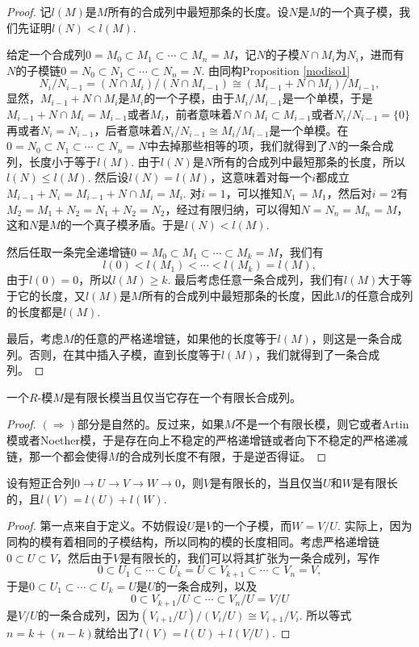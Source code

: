 \begin{proof}
	记$l(M)$是$M$所有的合成列中最短那条的长度。设$N$是$M$的一个真子模，我们先证明$l(N)<l(M)$.

	给定一个合成列$0=M_0\subset M_1\subset \cdots\subset M_n=M$，记$N$的子模$N\cap M_i$为$N_i$，进而有$N$的子模链$0=N_0\subset N_1\subset \cdots\subset N_n=N$. 由同构Proposition \ref{modiso1}
	\[
	N_i/N_{i-1}=(N\cap M_i)/(N\cap M_{i-1})\cong (M_{i-1}+N\cap M_i)/M_{i-1},
	\]
	显然，$M_{i-1}+N\cap M_i$是$M_i$的一个子模，由于$M_i/M_{i-1}$是一个单模，于是$M_{i-1}+N\cap M_i=M_{i-1}$或者$M_i$，前者意味着$N\cap M_i\subset M_{i-1}$或者$N_i/N_{i-1}=\{0\}$再或者$N_i=N_{i-1}$，后者意味着$N_i/N_{i-1}\cong M_i/M_{i-1}$是一个单模。在$0=N_0\subset N_1\subset \cdots\subset N_n=N$中去掉那些相等的项，我们就得到了$N$的一条合成列，长度小于等于$l(M)$. 由于$l(N)$是$N$所有的合成列中最短那条的长度，所以$l(N)\leq l(M)$. 然后设$l(N)=l(M)$，这意味着对每一个$i$都成立$M_{i-1}+N_i=M_{i-1}+N\cap M_i=M_i$. 对$i=1$，可以推知$N_1=M_1$，然后对$i=2$有$M_2=M_1+N_2=N_1+N_2=N_2$，经过有限归纳，可以得知$N=N_n=M_n=M$，这和$N$是$M$的一个真子模矛盾。于是$l(N)<l(M)$.

	然后任取一条完全递增链$0=M_0\subset M_1\subset \cdots\subset M_k=M$，我们有
	\[
	l(0)<l(M_1)<\cdots<l(M_k)=l(M),
	\]
	由于$l(0)=0$，所以$l(M)\geq k$. 最后考虑任意一条合成列，我们有$l(M)$大于等于它的长度，又$l(M)$是$M$所有的合成列中最短那条的长度，因此$M$的任意合成列的长度都是$l(M)$.

	最后，考虑$M$的任意的严格递增链，如果他的长度等于$l(M)$，则这是一条合成列。否则，在其中插入子模，直到长度等于$l(M)$，我们就得到了一条合成列。
\end{proof}

\begin{pro}
一个$R$-模$M$是有限长模当且仅当它存在一个有限长合成列。
\end{pro}

\begin{proof}
	$(\Rightarrow)$部分是自然的。反过来，如果$M$不是一个有限长模，则它或者Artin模或者Noether模，于是存在向上不稳定的严格递增链或者向下不稳定的严格递减链，那一个都会使得$M$的合成列长度不有限，于是逆否得证。
\end{proof}

\begin{pro}
设有短正合列$0\to U\to V\to W\to 0$，则$V$是有限长的，当且仅当$U$和$W$是有限长的，且$l(V)=l(U)+l(W)$.
\end{pro}

\begin{proof}
	第一点来自于定义。不妨假设$U$是$V$的一个子模，而$W=V/U$. 实际上，因为同构的模有着相同的子模结构，所以同构的模的长度相同。考虑严格递增链$0\subset U\subset V$，然后由于$V$是有限长的，我们可以将其扩张为一条合成列，写作
	\[
	0\subset U_1\subset \cdots \subset U_k=U\subset V_{k+1}\subset \cdots \subset V_n=V,
	\]
	于是$0\subset U_1\subset \cdots \subset U_k=U$是$U$的一条合成列，以及
	\[
	0\subset V_{k+1}/U\subset \cdots \subset V_n/U=V/U
	\]
	是$V/U$的一条合成列，因为$(V_{i+1}/U)/(V_{i}/U)\cong V_{i+1}/V_i$. 所以等式$n=k+(n-k)$就给出了$l(V)=l(U)+l(V/U)$.
\end{proof}

